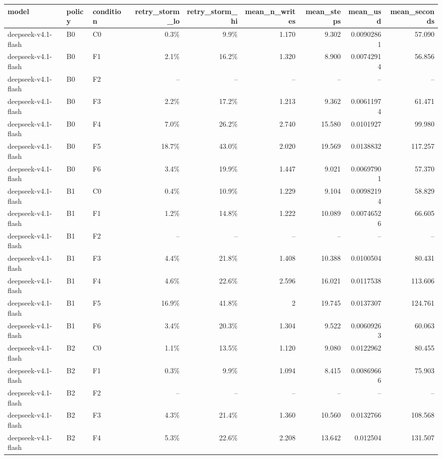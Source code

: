 \begin{tabular}{lllrrrrrr}
\toprule
model & policy & condition & retry\_storm\_lo & retry\_storm\_hi & mean\_n\_writes & mean\_steps & mean\_usd & mean\_seconds \\
\midrule
deepseek-v4.1-flash & B0 & C0 & 0.3\% & 9.9\% & 1.170 & 9.302 & 0.00902861 & 57.090 \\
deepseek-v4.1-flash & B0 & F1 & 2.1\% & 16.2\% & 1.320 & 8.900 & 0.00742914 & 56.856 \\
deepseek-v4.1-flash & B0 & F2 & -- & -- & -- & -- & -- & -- \\
deepseek-v4.1-flash & B0 & F3 & 2.2\% & 17.2\% & 1.213 & 9.362 & 0.00611974 & 61.471 \\
deepseek-v4.1-flash & B0 & F4 & 7.0\% & 26.2\% & 2.740 & 15.580 & 0.0101927 & 99.980 \\
deepseek-v4.1-flash & B0 & F5 & 18.7\% & 43.0\% & 2.020 & 19.569 & 0.0138832 & 117.257 \\
deepseek-v4.1-flash & B0 & F6 & 3.4\% & 19.9\% & 1.447 & 9.021 & 0.00697901 & 57.370 \\
deepseek-v4.1-flash & B1 & C0 & 0.4\% & 10.9\% & 1.229 & 9.104 & 0.00982194 & 58.829 \\
deepseek-v4.1-flash & B1 & F1 & 1.2\% & 14.8\% & 1.222 & 10.089 & 0.00746526 & 66.605 \\
deepseek-v4.1-flash & B1 & F2 & -- & -- & -- & -- & -- & -- \\
deepseek-v4.1-flash & B1 & F3 & 4.4\% & 21.8\% & 1.408 & 10.388 & 0.0100504 & 80.431 \\
deepseek-v4.1-flash & B1 & F4 & 4.6\% & 22.6\% & 2.596 & 16.021 & 0.0117538 & 113.606 \\
deepseek-v4.1-flash & B1 & F5 & 16.9\% & 41.8\% & 2 & 19.745 & 0.0137307 & 124.761 \\
deepseek-v4.1-flash & B1 & F6 & 3.4\% & 20.3\% & 1.304 & 9.522 & 0.00609263 & 60.063 \\
deepseek-v4.1-flash & B2 & C0 & 1.1\% & 13.5\% & 1.120 & 9.080 & 0.0122962 & 80.455 \\
deepseek-v4.1-flash & B2 & F1 & 0.3\% & 9.9\% & 1.094 & 8.415 & 0.00869666 & 75.903 \\
deepseek-v4.1-flash & B2 & F2 & -- & -- & -- & -- & -- & -- \\
deepseek-v4.1-flash & B2 & F3 & 4.3\% & 21.4\% & 1.360 & 10.560 & 0.0132766 & 108.568 \\
deepseek-v4.1-flash & B2 & F4 & 5.3\% & 22.6\% & 2.208 & 13.642 & 0.012504 & 131.507 \\

\end{tabular}
